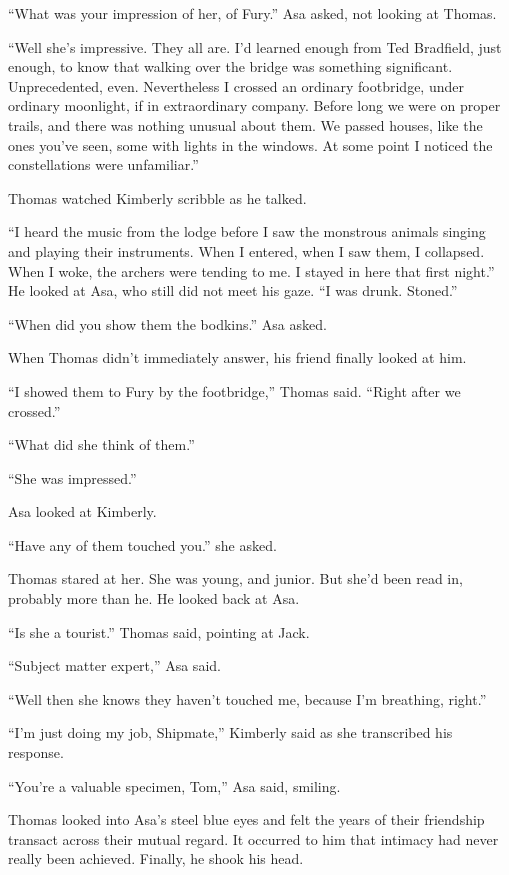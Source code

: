\documentclass[11pt,a5paper]{article}
\begin{document}
``What was your impression of her, of Fury.'' Asa asked, not looking at Thomas.

``Well she's impressive. They all are. I'd learned enough from Ted Bradfield, just enough, to know that walking over the bridge was something significant. Unprecedented, even. Nevertheless I crossed an ordinary footbridge, under ordinary moonlight, if in extraordinary company. Before long we were on proper trails, and there was nothing unusual about them. We passed houses, like the ones you've seen, some with lights in the windows. At some point I noticed the constellations were unfamiliar.''

Thomas watched Kimberly scribble as he talked.

``I heard the music from the lodge before I saw the monstrous animals singing and playing their instruments. When I entered, when I saw them, I collapsed. When I woke, the archers were tending to me. I stayed in here that first night.'' He looked at Asa, who still did not meet his gaze. ``I was drunk. Stoned.''

``When did you show them the bodkins.'' Asa asked.

When Thomas didn't immediately answer, his friend finally looked at him.

``I showed them to Fury by the footbridge,'' Thomas said. ``Right after we crossed.''

``What did she think of them.''

``She was impressed.''

Asa looked at Kimberly.

``Have any of them touched you.'' she asked.

Thomas stared at her. She was young, and junior. But she'd been read in, probably more than he. He looked back at Asa.

``Is she a tourist.'' Thomas said, pointing at Jack.

``Subject matter expert,'' Asa said.

``Well then she knows they haven't touched me, because I'm breathing, right.''

``I'm just doing my job, Shipmate,'' Kimberly said as she transcribed his response.

``You're a valuable specimen, Tom,'' Asa said, smiling.

Thomas looked into Asa's steel blue eyes and felt the years of their friendship transact across their mutual regard. It occurred to him that intimacy had never really been achieved. Finally, he shook his head.
\end{document}
